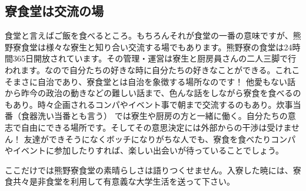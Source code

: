 		\subsection{寮食堂は交流の場}
		食堂と言えばご飯を食べるところ。もちろんそれが食堂の一番の意味ですが、熊野寮食堂は様々な寮生と知り合い交流する場でもあります。熊野寮の食堂は24時間365日開放されています。その管理・運営は寮生と厨房員さんの二人三脚で行われます。なので自分たちの好きな時に自分たちの好きなことができる。これこそまさに自治であり、寮食堂とは自治を象徴する場所なのです！ 他愛もない話から昨今の政治の動きなどの難しい話まで、色んな話をしながら寮食を食べるのもあり。時々企画されるコンパやイベント事で朝まで交流するのもあり。炊事当番（食器洗い当番とも言う） では寮生や厨房の方と一緒に働く。自分たちの意志で自由にできる場所です。そしてその意思決定には外部からの干渉は受けません！ 友達ができそうになくボッチになりがちな人でも、寮食を食べたりコンパやイベントに参加したりすれば、楽しい出会いが待っていることでしょう。

		ここだけでは熊野寮食堂の素晴らしさは語りつくせません。入寮した暁には、寮食共々是非食堂を利用して有意義な大学生活を送って下さい。




